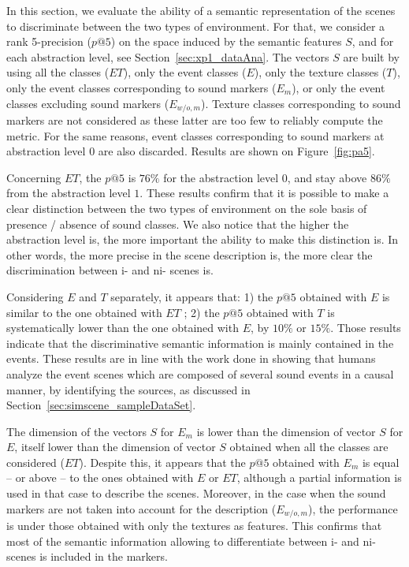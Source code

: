 \documentclass[twoside,twocolumn]{article}
\begin{document}
In this section, we evaluate the ability of a semantic representation of the scenes to discriminate between the two types of environment. For that, we consider a rank 5-precision ($p@5$) on the space induced by the semantic features $S$, and for each abstraction level, see Section~\ref{sec:xp1_dataAna}. The vectors $S$ are built by using all the classes ($ET$), only the event classes ($E$), only the texture classes ($T$), only the event classes corresponding to sound markers ($E_m$), or only the event classes excluding sound markers ($E_{w/o,m}$). Texture classes corresponding to sound markers are not considered as these latter are too few to reliably compute the metric. For the same reasons, event classes corresponding to sound markers at abstraction level $0$ are also discarded. Results are shown on Figure~\ref{fig:pa5}.

Concerning $ET$, the $p@5$ is $76\%$ for the abstraction level $0$, and stay above $86\%$ from the abstraction level $1$. These results confirm that it is possible to make a clear distinction between the two types of environment on the sole basis of presence / absence of sound classes. We also notice that the higher the abstraction level is, the more important the ability to make this distinction is. In other words, the more precise in the scene description is, the more clear the discrimination between i- and ni- scenes is.

Considering $E$ and $T$ separately, it appears that: 1) the $p@5$ obtained with $E$ is similar to the one obtained with $ET$ ; 2) the $p@5$ obtained with $T$ is systematically lower than the one obtained with $E$, by $10\%$ or $15\%$. Those results indicate that the discriminative semantic information is mainly contained in the events. These results are in line with the work done in \cite{maffiolo_caracterisation_1999} showing that humans analyze the event scenes which are composed of several sound events in a causal manner, \ie by identifying the sources, as discussed in Section~\ref{sec:simscene_sampleDataSet}.

The dimension of the vectors $S$ for $E_m$ is lower than the dimension of vector $S$ for $E$, itself lower than the dimension of vector $S$ obtained when all the classes are considered ($ET$). Despite this, it appears that the $p@5$ obtained with $E_m$ is equal – or above – to the ones obtained with $E$ or $ET$, although a partial information is used in that case to describe the scenes. Moreover, in the case when the sound markers are not taken into account for the description ($E_{w/o,m}$), the performance is under those obtained with only the textures as features. This confirms that most of the semantic information allowing to differentiate between i- and ni- scenes is included in the markers.
\end{document}

